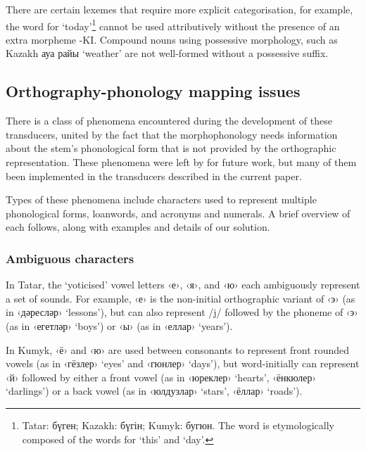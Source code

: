 \documentclass[a4paper,11pt,twocolumn]{article}
\begin{document}
There are certain lexemes that require more explicit categorisation, for example, the word 
for `today'\footnote{Tatar: бүген; Kazakh: бүгін; Kumyk: бугюн. The word is etymologically composed of the words for `this' and `day'.} 
cannot be used attributively without the presence of an extra morpheme -KI. Compound nouns
using possessive morphology, such as Kazakh ауа райы `weather' are not well-formed
without a possessive suffix. %


\subsection{Orthography-phonology mapping issues}

There is a class of phenomena encountered during the development of these transducers, united by the fact that the morphophonology needs information about the stem's phonological form that is not provided by the orthographic representation.  These phenomena were left by \citet{washington2012} for future work, but many of them been implemented in the transducers described in the current paper.

Types of these phenomena include characters used to represent multiple phonological forms, loanwords, and acronyms and numerals.  A brief overview of each follows, along with examples and details of our solution.

\subsubsection{Ambiguous characters}
In Tatar, the `yoticised' vowel letters ‹е›, ‹я›, and ‹ю› each ambiguously represent a set of sounds.  For example, ‹е› is the non-initial orthographic variant of ‹э› (as in ‹дәресләр› `lessons'), but can also represent /j/ followed by the phoneme of ‹э› (as in ‹егетләр› `boys') or ‹ы› (as in ‹еллар› `years').

In Kumyk, ‹ё› and ‹ю› are used between consonants to represent front rounded vowels (as in ‹гёзлер› `eyes' and ‹гюнлер› `days'), but word-initially can represent ‹й› followed by either a front vowel (as in ‹юреклер› `hearts', ‹ёнкюлер› `darlings') or a back vowel (as in ‹юлдузлар› `stars', ‹ёллар› `roads').
\end{document}
